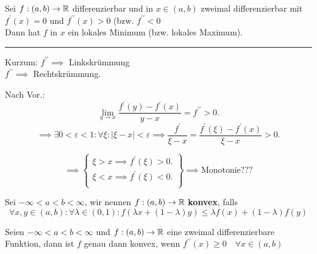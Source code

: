 \begin{subtheorem}
	Sei $ f : (a, b) \to \R  $ differenzierbar und in $ x \in (a, b) $ zweimal differenzierbar mit $ f^\prime(x) = 0 $ und $ f^{\prime\prime} (x) > 0 $ (bzw. $ f^{\prime\prime} < 0 $\\
	Dann hat $ f $ in $ x $ ein lokales Minimum (bzw. lokales Maximum).
	\hrule height 0.4pt depth 0pt width 2cm \relax
	\noindent Kurzum: $ f^{\prime\prime} \implies $ Linkskrümmung\\
	\phantom{Kurzum: $$}$ f^{\prime\prime} \implies $ Rechtskrümmung.\\
\end{subtheorem}

\begin{subproof*}
	Nach Vor.: 
	\[
		\lim_{y \to x} \frac{ f^\prime(y) - f^\prime(x) }{ y - x } = f^{\prime\prime} > 0.
	\]
	\[
		\implies \exists 0 < \varepsilon < 1 : \forall \xi : \left| \xi - x \right| < \varepsilon  \implies \frac{ f^\prime }{ \xi - x } = \frac{ f^\prime(\xi) - f^\prime(x) }{ \xi - x } > 0.
	\]
	
	\[
		\implies \begin{Bmatrix}
			\xi > x \implies f^\prime(\xi) > 0.\\
			\xi < x \implies f^\prime(\xi) < 0.\\
		\end{Bmatrix} 
		\implies  \text{Monotonie} ???
	\]
	
\end{subproof*}

\begin{subdefinition}
	Sei $ -\infty < a < b < \infty $, wir nennen $ f : (a, b) \to \mathbb{R}  $ \textbf{konvex}, falls
	\[
		\forall x, y \in (a, b) : \forall \lambda \in (0, 1) : f( \lambda x + ( 1 - \lambda ) y) \leq \lambda f(x) + ( 1 - \lambda ) f(y)
	\]
	
\end{subdefinition}

\begin{subtheorem}
	Seien $ - \infty < a < b < \infty $ und $ f : (a, b) \to \mathbb{R}  $ eine zweimal differenzierbare Funktion, dann ist $ f $ genau dann konvex, wenn $ f^{\prime\prime}(x) \geq 0  \quad \forall x \in (a, b) $
\end{subtheorem}


